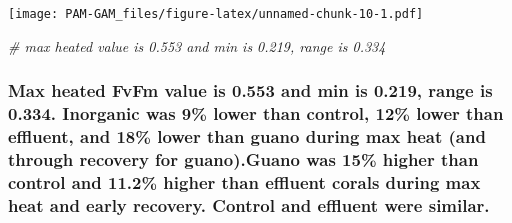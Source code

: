 \documentclass[
]{article}
\newenvironment{Shaded}{\begin{snugshade}}{\end{snugshade}}
\newcommand{\AttributeTok}[1]{\textcolor[rgb]{0.13,0.29,0.53}{#1}}
\newcommand{\CommentTok}[1]{\textcolor[rgb]{0.56,0.35,0.01}{\textit{#1}}}
\newcommand{\DecValTok}[1]{\textcolor[rgb]{0.00,0.00,0.81}{#1}}
\newcommand{\FunctionTok}[1]{\textcolor[rgb]{0.13,0.29,0.53}{\textbf{#1}}}
\newcommand{\NormalTok}[1]{#1}
\newcommand{\SpecialCharTok}[1]{\textcolor[rgb]{0.81,0.36,0.00}{\textbf{#1}}}
\begin{document}
\begin{Shaded}
\end{Shaded}

\texttt{[image: PAM-GAM\_files/figure-latex/unnamed-chunk-10-1.pdf]}

\begin{Shaded}
\begin{Highlighting}[]
\CommentTok{\# max heated value is 0.553 and min is 0.219, range is 0.334}
\end{Highlighting}
\end{Shaded}

\hypertarget{max-heated-fvfm-value-is-0.553-and-min-is-0.219-range-is-0.334.-inorganic-was-9-lower-than-control-12-lower-than-effluent-and-18-lower-than-guano-during-max-heat-and-through-recovery-for-guano.guano-was-15-higher-than-control-and-11.2-higher-than-effluent-corals-during-max-heat-and-early-recovery.-control-and-effluent-were-similar.}{%
\subsubsection{Max heated FvFm value is 0.553 and min is 0.219, range is
0.334. Inorganic was 9\% lower than control, 12\% lower than effluent,
and 18\% lower than guano during max heat (and through recovery for
guano).Guano was 15\% higher than control and 11.2\% higher than
effluent corals during max heat and early recovery. Control and effluent
were
similar.}\label{max-heated-fvfm-value-is-0.553-and-min-is-0.219-range-is-0.334.-inorganic-was-9-lower-than-control-12-lower-than-effluent-and-18-lower-than-guano-during-max-heat-and-through-recovery-for-guano.guano-was-15-higher-than-control-and-11.2-higher-than-effluent-corals-during-max-heat-and-early-recovery.-control-and-effluent-were-similar.}}
\end{document}

